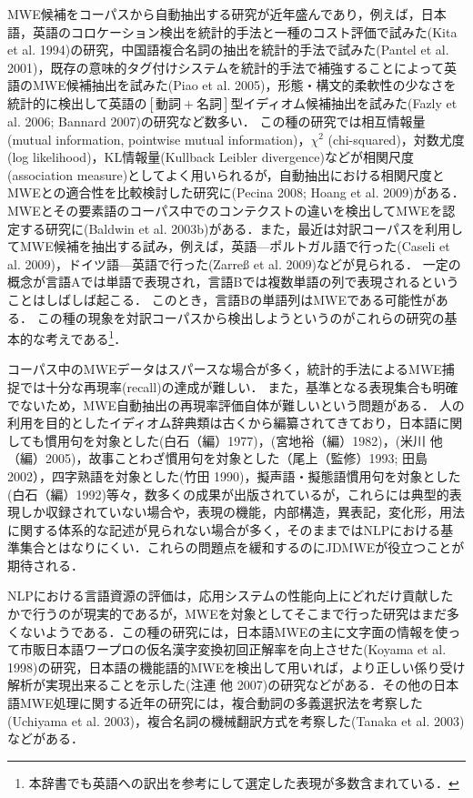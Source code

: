 \documentclass[japanese]{jnlp_1.4}
\begin{document}
MWE候補をコーパスから自動抽出する研究が近年盛んであり，例えば，日本語，英語のコロケーション検出を統計的手法と一種のコスト評価で試みた(Kita et al. 1994)の研究，中国語複合名詞の抽出を統計的手法で試みた(Pantel et al. 2001)，既存の意味的タグ付けシステムを統計的手法で補強することによって英語のMWE候補抽出を試みた(Piao et al. 2005)，形態・構文的柔軟性の少なさを統計的に検出して英語の$[\text{動詞}+\text{名詞}]$型イディオム候補抽出を試みた(Fazly et al. 2006; Bannard 2007)の研究など数多い．
この種の研究では相互情報量(mutual information, pointwise mutual information)，$\chi^{2}$ (chi-squared)，対数尤度(log likelihood)，KL情報量(Kullback Leibler divergence)などが相関尺度(association measure)としてよく用いられるが，自動抽出における相関尺度とMWEとの適合性を比較検討した研究に(Pecina 2008; Hoang et al. 2009)がある．MWEとその要素語のコーパス中でのコンテクストの違いを検出してMWEを認定する研究に(Baldwin et al. 2003b)がある．また，最近は対訳コーパスを利用してMWE候補を抽出する試み，例えば，英語—ポルトガル語で行った(Caseli et al. 2009)，ドイツ語—英語で行った(Zarre{\ss} et al. 2009)などが見られる．
一定の概念が言語Aでは単語で表現され，言語Bでは複数単語の列で表現されるということはしばしば起こる．
このとき，言語Bの単語列はMWEである可能性がある．
この種の現象を対訳コーパスから検出しようというのがこれらの研究の基本的な考えである\footnote{本辞書でも英語への訳出を参考にして選定した表現が多数含まれている．}． 


コーパス中のMWEデータはスパースな場合が多く，統計的手法によるMWE捕捉では十分な再現率(recall)の達成が難しい．
また，基準となる表現集合も明確でないため，MWE自動抽出の再現率評価自体が難しいという問題がある．
人の利用を目的としたイディオム辞典類は古くから編纂されてきており，日本語に関しても慣用句を対象とした(白石（編）1977)，(宮地裕（編）1982)，(米川 他（編）2005)，故事ことわざ慣用句を対象とした（尾上（監修）1993; 田島 2002），四字熟語を対象とした(竹田 1990)，擬声語・擬態語慣用句を対象とした(白石（編）1992)等々，数多くの成果が出版されているが，これらには典型的表現しか収録されていない場合や，表現の機能，内部構造，異表記，変化形，用法に関する体系的な記述が見られない場合が多く，そのままではNLPにおける基準集合とはなりにくい．これらの問題点を緩和するのにJDMWEが役立つことが期待される．

NLPにおける言語資源の評価は，応用システムの性能向上にどれだけ貢献したかで行うのが現実的であるが，MWEを対象としてそこまで行った研究はまだ多くないようである．この種の研究には，日本語MWEの主に文字面の情報を使って市販日本語ワープロの仮名漢字変換初回正解率を向上させた(Koyama et al. 1998)の研究，日本語の機能語的MWEを検出して用いれば，より正しい係り受け解析が実現出来ることを示した(注連 他 2007)の研究などがある．その他の日本語MWE処理に関する近年の研究には，複合動詞の多義選択法を考察した(Uchiyama et al. 2003)，複合名詞の機械翻訳方式を考察した(Tanaka et al. 2003)などがある．
\end{document}
